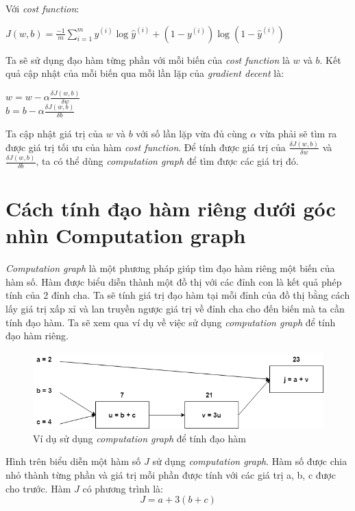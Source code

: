 Với \textit{cost function}:
\begin{center}
$J(w, b) = \frac{-1}{m}\sum_{i=1}^{m}y^{(i)}\log \hat{y}^{(i)}+(1-y^{(i)})\log (1-\hat{y}^{(i)})$
\end{center}

Ta sẽ sử dụng đạo hàm từng phần với mỗi biến của \textit{cost function} là $w$ và $b$. Kết quả cập nhật của mỗi biến qua mỗi lần lặp của \textit{gradient decent} là:
\begin{center}
$w = w - \alpha\frac{\delta J(w, b)}{\delta w}$\\
$b = b - \alpha\frac{\delta J(w, b)}{\delta b}$
\end{center}

Ta cập nhật giá trị của $w$ và $b$ với số lần lặp vừa đủ cùng $\alpha$ vừa phải sẽ tìm ra được giá trị tối ưu của hàm \textit{cost function}. Để tính được giá trị của $\frac{\delta J(w, b)}{\delta w}$ và $\frac{\delta J(w, b)}{\delta b}$, ta có thể dùng \textit{computation graph} để tìm được các giá trị đó.

\section{Cách tính đạo hàm riêng dưới góc nhìn Computation graph}
\textit{Computation graph} là một phương pháp giúp tìm đạo hàm riêng một biến của hàm số. Hàm được biểu diễn thành một đồ thị với các đỉnh con là kết quả phép tính của 2 đỉnh cha. Ta sẽ tính giá trị đạo hàm tại mỗi đỉnh của đồ thị bằng cách lấy giá trị xấp xỉ và lan truyền ngược giá trị về đỉnh cha cho đến biến mà ta cần tính đạo hàm. Ta sẽ xem qua ví dụ về việc sử dụng \textit{computation graph} để tính đạo hàm riêng.
\begin{figure}[!h]
\centerline{\includegraphics[scale=0.5]{books/artificial-neural-network/chapter02/figure/com_1.png}}
\caption{Ví dụ sử dụng \textit{computation graph} để tính đạo hàm}
\label{fig:com_1}
\end{figure}

Hình trên biểu diễn một hàm số $J$ sử dụng \textit{computation graph}. Hàm số được chia nhỏ thành từng phần và giá trị mỗi phần được tính với các giá trị a, b, c được cho trước. Hàm $J$ có phương trình là:
\begin{equation}
\label{sec2:eqn6}
J = a + 3(b + c)
\end{equation}

